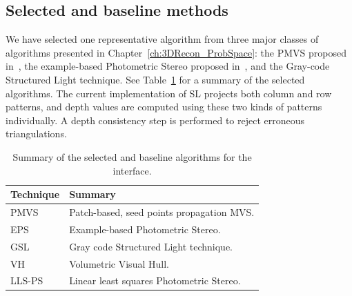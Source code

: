 \subsection{Selected and baseline methods}
We have selected one representative algorithm from three major classes of algorithms presented in Chapter~\ref{ch:3DRecon_ProbSpace}: the PMVS proposed in~\cite{furukawa2010accurate}, the example-based Photometric Stereo proposed in~\cite{hertzmann2005example}, and the Gray-code Structured Light technique. See Table~\ref{tab:selected_algos} for a summary of the selected algorithms. The current implementation of SL projects both column and row patterns, and depth values are computed using these two kinds of patterns individually. A depth consistency step is performed to reject erroneous triangulations.
\begin{table}[!htbp]
\centering
\begin{tabular}{l|l}
\toprule
Technique & Summary\\
\midrule
PMVS & Patch-based, seed points propagation MVS.\\
EPS & Example-based Photometric Stereo.\\
GSL & Gray code Structured Light technique.\\
\midrule
VH & Volumetric Visual Hull.\\
LLS-PS & Linear least squares Photometric Stereo.\\
\bottomrule
\end{tabular}
\caption{Summary of the selected and baseline algorithms for the interface.}
\label{tab:selected_algos}
\end{table}

